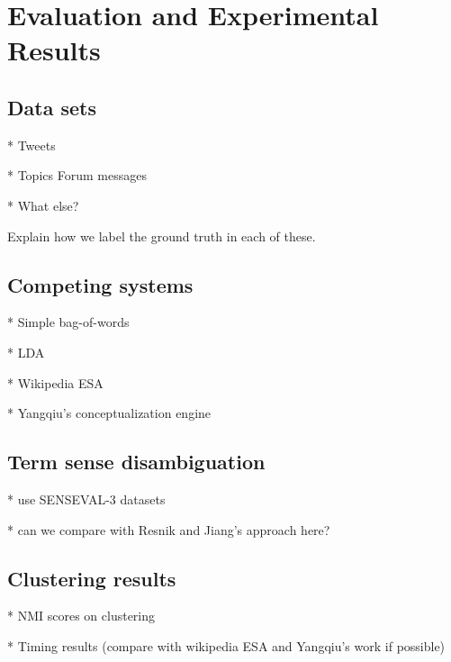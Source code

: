 \section{Evaluation and Experimental Results}
\label{sec:eval}

\subsection{Data sets}
* Tweets

* Topics Forum messages

* What else?

Explain how we label the ground truth in each of these.

\subsection{Competing systems}
* Simple bag-of-words

* LDA

* Wikipedia ESA

* Yangqiu's conceptualization engine


\subsection{Term sense disambiguation} 
* use SENSEVAL-3 datasets

* can we compare with Resnik and Jiang's approach here?

\subsection{Clustering results}
* NMI scores on clustering 

* Timing results (compare with wikipedia ESA and Yangqiu's work if possible)
